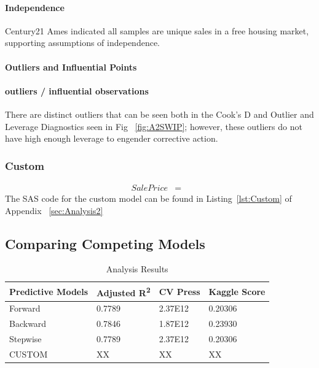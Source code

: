\documentclass[11pt]{scrartcl} %
\begin{document}
\paragraph{Independence} Century21 Ames indicated all samples are unique sales in a free housing market, supporting assumptions of independence. 
\paragraph{Outliers and Influential Points}
\paragraph{outliers / influential observations} There are distinct outliers that can be seen both in the Cook's D and Outlier and Leverage Diagnostics seen in Fig ~\ref{fig:A2SWIP}; however, these outliers do not have high enough leverage to engender corrective action.

\subsubsection{Custom}
\begin{eqnarray*}
SalePrice &=& 
\end{eqnarray*}
The SAS code for the custom model can be found in Listing~\ref{lst:Custom} of Appendix ~\ref{sec:Analysis2}

\subsection{Comparing Competing Models}
\begin{table}[h] %
	\centering %
\begin{tabular}{|l|l|l|l|}
\hline
\textbf{Predictive Models} & \textbf{Adjusted R\textsuperscript{2}} & \textbf{CV Press} & \textbf{Kaggle Score}\\
\hline
Forward & 0.7789 & 2.37E12 & 0.20306\\
\hline
Backward & 0.7846 & 1.87E12 & 0.23930\\
\hline
Stepwise & 0.7789 & 2.37E12 & 0.20306\\
\hline
CUSTOM & XX & XX & XX\\
\hline
\end{tabular}
\caption{Analysis Results}
\end{table}
\end{document}
